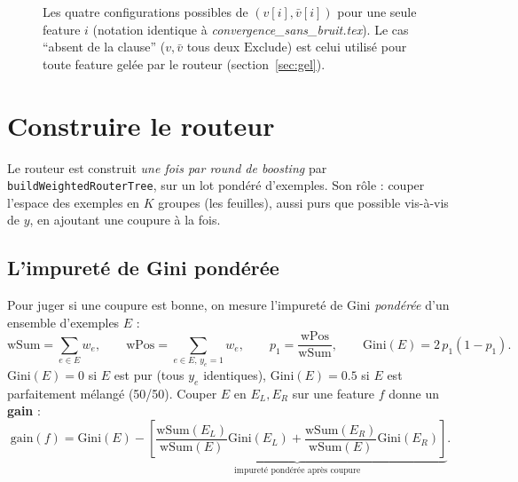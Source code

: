 \documentclass[12pt,a4paper]{article}
\newcommand{\Inc}{\ensuremath{\mathrm{Include}}}
\newcommand{\Exc}{\ensuremath{\mathrm{Exclude}}}
\newcommand{\vbar}{\bar{v}}
\newcommand{\code}[1]{\texttt{#1}}
\theoremstyle{remark}
\begin{document}
\begin{figure}[h]
\centering
{}
\caption{Les quatre configurations possibles de $(v[i],\vbar[i])$ pour une seule
feature $i$ (notation identique à \emph{convergence\_sans\_bruit.tex}). Le cas
``absent de la clause'' ($v,\vbar$ tous deux \Exc) est celui utilisé pour toute
feature gelée par le routeur (section~\ref{sec:gel}).}
\label{fig:config-rappel}
\end{figure}

\section{Construire le routeur}\label{sec:router}

Le routeur est construit \emph{une fois par round de boosting} par
\code{buildWeightedRouterTree}, sur un lot pondéré d'exemples. Son rôle : couper
l'espace des exemples en $K$ groupes (les feuilles), aussi purs que possible
vis-à-vis de $y$, en ajoutant une coupure à la fois.

\subsection{L'impureté de Gini pondérée}

Pour juger si une coupure est bonne, on mesure l'impureté de Gini \emph{pondérée}
d'un ensemble d'exemples $E$ :
\[
  \mathrm{wSum} = \sum_{e\in E} w_e, \qquad
  \mathrm{wPos} = \sum_{e\in E,\, y_e=1} w_e, \qquad
  p_1 = \frac{\mathrm{wPos}}{\mathrm{wSum}}, \qquad
  \mathrm{Gini}(E) = 2\,p_1(1-p_1).
\]
$\mathrm{Gini}(E)=0$ si $E$ est pur (tous $y_e$ identiques), $\mathrm{Gini}(E)=0.5$
si $E$ est parfaitement mélangé (50/50). Couper $E$ en $E_L,E_R$ sur une feature
$f$ donne un \textbf{gain} :
\[
  \mathrm{gain}(f) = \mathrm{Gini}(E) - \underbrace{\left[\frac{\mathrm{wSum}(E_L)}{\mathrm{wSum}(E)}\mathrm{Gini}(E_L)
  + \frac{\mathrm{wSum}(E_R)}{\mathrm{wSum}(E)}\mathrm{Gini}(E_R)\right]}_{\text{impureté pondérée après coupure}}.
\]
\end{document}
